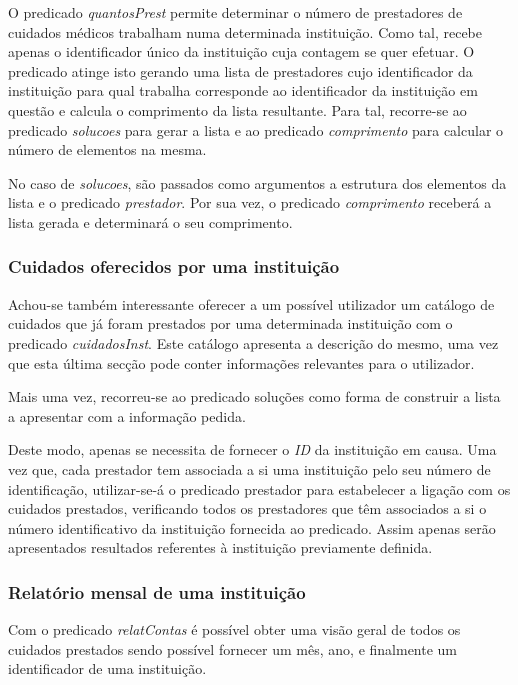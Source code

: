\documentclass[a4paper]{article}
\begin{document}
\hspace{3mm} O predicado \textit{quantosPrest} permite determinar o número de prestadores de cuidados médicos trabalham numa determinada instituição. Como tal, recebe apenas o identificador único da instituição cuja contagem se quer efetuar. O predicado atinge isto gerando uma lista de prestadores cujo identificador da instituição para qual trabalha corresponde ao identificador da instituição em questão e calcula o comprimento da lista resultante. Para tal, recorre-se ao predicado \textit{solucoes} para gerar a lista e ao predicado \textit{comprimento} para calcular o número de elementos na mesma. 
\par No caso de \textit{solucoes}, são passados como argumentos a estrutura dos elementos da lista e o predicado \textit{prestador}. Por sua vez, o predicado \textit{comprimento} receberá a lista gerada e determinará o seu comprimento.

\subsubsection{Cuidados oferecidos por uma instituição}

\hspace{3mm} Achou-se também interessante oferecer a um possível utilizador um catálogo de cuidados que já foram prestados por uma determinada instituição com o predicado \emph{cuidadosInst}. Este catálogo apresenta a descrição do mesmo, uma vez que esta última secção pode conter informações relevantes para o utilizador.
\par Mais uma vez, recorreu-se ao predicado soluções como forma de construir a lista a apresentar com a informação pedida.
\par Deste modo, apenas se necessita de fornecer o \emph{ID} da instituição em causa. Uma vez que, cada prestador tem associada a si uma instituição pelo seu número de identificação, utilizar-se-á o predicado prestador para estabelecer a ligação com os cuidados prestados, verificando todos os prestadores que têm associados a si o número identificativo da instituição fornecida ao predicado. Assim apenas serão apresentados resultados referentes à instituição previamente definida.

\subsubsection{Relatório mensal de uma instituição}

\hspace{3mm} Com o predicado \emph{relatContas} é possível obter uma visão geral de todos os cuidados prestados sendo possível fornecer um mês, ano, e finalmente um identificador de uma instituição. 
\end{document}
